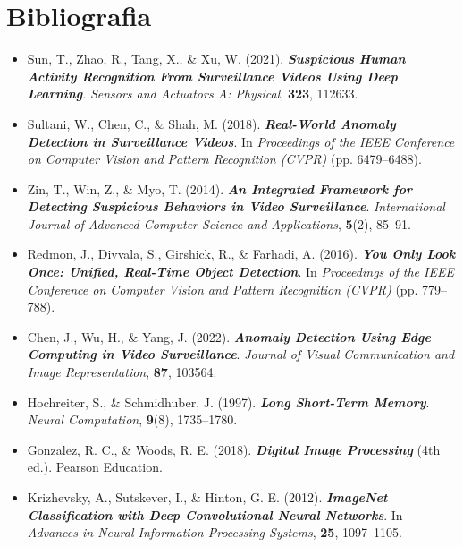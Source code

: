 \section{Bibliografia}

\begin{itemize}
    \item Sun, T., Zhao, R., Tang, X., \& Xu, W. (2021). \textbf{\textit{Suspicious Human Activity Recognition From Surveillance Videos Using Deep Learning}}. \textit{Sensors and Actuators A: Physical}, \textbf{323}, 112633.

    \item Sultani, W., Chen, C., \& Shah, M. (2018). \textbf{\textit{Real-World Anomaly Detection in Surveillance Videos}}. In \textit{Proceedings of the IEEE Conference on Computer Vision and Pattern Recognition (CVPR)} (pp. 6479--6488).

    \item Zin, T., Win, Z., \& Myo, T. (2014). \textbf{\textit{An Integrated Framework for Detecting Suspicious Behaviors in Video Surveillance}}. \textit{International Journal of Advanced Computer Science and Applications}, \textbf{5}(2), 85--91.

    \item Redmon, J., Divvala, S., Girshick, R., \& Farhadi, A. (2016). \textbf{\textit{You Only Look Once: Unified, Real-Time Object Detection}}. In \textit{Proceedings of the IEEE Conference on Computer Vision and Pattern Recognition (CVPR)} (pp. 779--788).

    \item Chen, J., Wu, H., \& Yang, J. (2022). \textbf{\textit{Anomaly Detection Using Edge Computing in Video Surveillance}}. \textit{Journal of Visual Communication and Image Representation}, \textbf{87}, 103564.

    \item Hochreiter, S., \& Schmidhuber, J. (1997). \textbf{\textit{Long Short-Term Memory}}. \textit{Neural Computation}, \textbf{9}(8), 1735--1780.

    \item Gonzalez, R. C., \& Woods, R. E. (2018). \textbf{\textit{Digital Image Processing}} (4th ed.). Pearson Education.

    \item Krizhevsky, A., Sutskever, I., \& Hinton, G. E. (2012). \textbf{\textit{ImageNet Classification with Deep Convolutional Neural Networks}}. In \textit{Advances in Neural Information Processing Systems}, \textbf{25}, 1097--1105.


\end{itemize}
